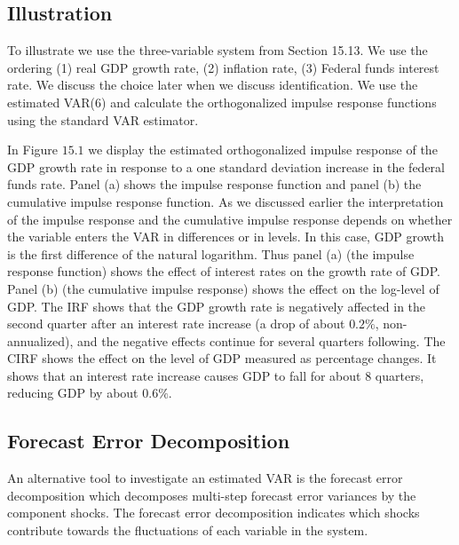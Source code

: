 \documentclass[10pt]{article}
\begin{document}
\subsection{Illustration}
To illustrate we use the three-variable system from Section 15.13. We use the ordering (1) real GDP growth rate, (2) inflation rate, (3) Federal funds interest rate. We discuss the choice later when we discuss identification. We use the estimated VAR(6) and calculate the orthogonalized impulse response functions using the standard VAR estimator.

In Figure $15.1$ we display the estimated orthogonalized impulse response of the GDP growth rate in response to a one standard deviation increase in the federal funds rate. Panel (a) shows the impulse response function and panel (b) the cumulative impulse response function. As we discussed earlier the interpretation of the impulse response and the cumulative impulse response depends on whether the variable enters the VAR in differences or in levels. In this case, GDP growth is the first difference of the natural logarithm. Thus panel (a) (the impulse response function) shows the effect of interest rates on the growth rate of GDP. Panel (b) (the cumulative impulse response) shows the effect on the log-level of GDP. The IRF shows that the GDP growth rate is negatively affected in the second quarter after an interest rate increase (a drop of about $0.2 \%$, non-annualized), and the negative effects continue for several quarters following. The CIRF shows the effect on the level of GDP measured as percentage changes. It shows that an interest rate increase causes GDP to fall for about 8 quarters, reducing GDP by about $0.6 \%$.

\subsection{Forecast Error Decomposition}
An alternative tool to investigate an estimated VAR is the forecast error decomposition which decomposes multi-step forecast error variances by the component shocks. The forecast error decomposition indicates which shocks contribute towards the fluctuations of each variable in the system.
\end{document}
